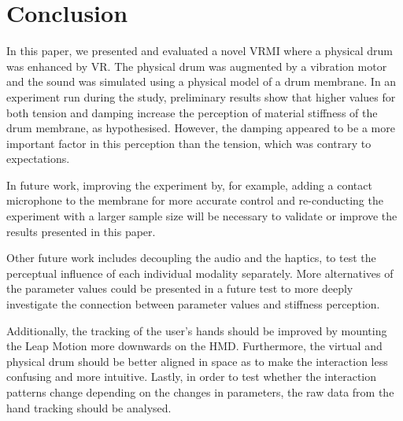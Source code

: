 \documentclass{article}
\begin{document}

\section{Conclusion}\label{sec:conc}

In this paper, we presented and evaluated a novel VRMI where a physical drum was enhanced by VR. The physical drum was augmented by a vibration motor and the sound was simulated using a physical model of a drum membrane. In an experiment run during the study, preliminary results show that higher values for both tension and damping increase the perception of material stiffness of the drum membrane, as hypothesised. However, the damping appeared to be a more important factor in this perception than the tension, which was contrary to expectations. 

In future work, improving the experiment by, for example, adding a contact microphone to the membrane for more accurate control and re-conducting the experiment with a larger sample size will be necessary to validate or improve the results presented in this paper.

Other future work includes decoupling the audio and the haptics, to test the perceptual influence of each individual modality separately. More alternatives of the parameter values could be presented in a future test to more deeply investigate the connection between parameter values and stiffness perception.

Additionally, the tracking of the user's hands should be improved by mounting the Leap Motion more downwards on the HMD. Furthermore, the virtual and physical drum should be better aligned in space as to make the interaction less confusing and more intuitive.
Lastly, in order to test whether the interaction patterns change depending on the changes in parameters, the raw data from the hand tracking should be analysed. %
\end{document}

